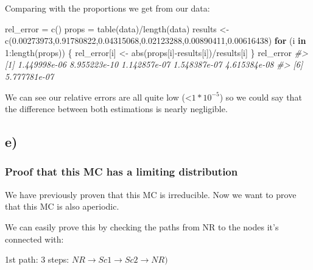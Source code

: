 \documentclass[
]{article}
\newenvironment{Shaded}{\begin{snugshade}}{\end{snugshade}}
\newcommand{\CommentTok}[1]{\textcolor[rgb]{0.56,0.35,0.01}{\textit{#1}}}
\newcommand{\ControlFlowTok}[1]{\textcolor[rgb]{0.13,0.29,0.53}{\textbf{#1}}}
\newcommand{\DecValTok}[1]{\textcolor[rgb]{0.00,0.00,0.81}{#1}}
\newcommand{\FloatTok}[1]{\textcolor[rgb]{0.00,0.00,0.81}{#1}}
\newcommand{\FunctionTok}[1]{\textcolor[rgb]{0.00,0.00,0.00}{#1}}
\newcommand{\NormalTok}[1]{#1}
\newcommand{\OtherTok}[1]{\textcolor[rgb]{0.56,0.35,0.01}{#1}}
\newcommand{\SpecialCharTok}[1]{\textcolor[rgb]{0.00,0.00,0.00}{#1}}
\begin{document}
\newpage

Comparing with the proportions we get from our data:

\begin{Shaded}
\begin{Highlighting}[]
\NormalTok{rel\_error }\OtherTok{=} \FunctionTok{c}\NormalTok{()}
\NormalTok{props }\OtherTok{=} \FunctionTok{table}\NormalTok{(data)}\SpecialCharTok{/}\FunctionTok{length}\NormalTok{(data)}
\NormalTok{results }\OtherTok{\textless{}{-}} \FunctionTok{c}\NormalTok{(}\FloatTok{0.00273973}\NormalTok{,}\FloatTok{0.91780822}\NormalTok{,}\FloatTok{0.04315068}\NormalTok{,}\FloatTok{0.02123288}\NormalTok{,}\FloatTok{0.00890411}\NormalTok{,}\FloatTok{0.00616438}\NormalTok{)}
\ControlFlowTok{for}\NormalTok{ (i }\ControlFlowTok{in} \DecValTok{1}\SpecialCharTok{:}\FunctionTok{length}\NormalTok{(props)) \{}
\NormalTok{    rel\_error[i] }\OtherTok{\textless{}{-}} \FunctionTok{abs}\NormalTok{(props[i]}\SpecialCharTok{{-}}\NormalTok{results[i])}\SpecialCharTok{/}\NormalTok{results[i]}
\NormalTok{\}}
\NormalTok{rel\_error}
\CommentTok{\#\textgreater{} [1] 1.449998e{-}06 8.955223e{-}10 1.142857e{-}07 1.548387e{-}07 4.615384e{-}08}
\CommentTok{\#\textgreater{} [6] 5.777781e{-}07}
\end{Highlighting}
\end{Shaded}

We can see our relative errors are all quite low
(\textless{}\(1*10^{-5}\)) so we could say that the difference between
both estimations is nearly negligible.

\hypertarget{e}{%
\subsection{e)}\label{e}}

\hypertarget{proof-that-this-mc-has-a-limiting-distribution}{%
\subsubsection{Proof that this MC has a limiting
distribution}\label{proof-that-this-mc-has-a-limiting-distribution}}

We have previously proven that this MC is irreducible. Now we want to
prove that this MC is also aperiodic.

We can easily prove this by checking the paths from NR to the nodes it's
connected with:

1st path: 3 steps:
\(NR \rightarrow Sc1 \rightarrow Sc2 \rightarrow NR)\)
\end{document}
